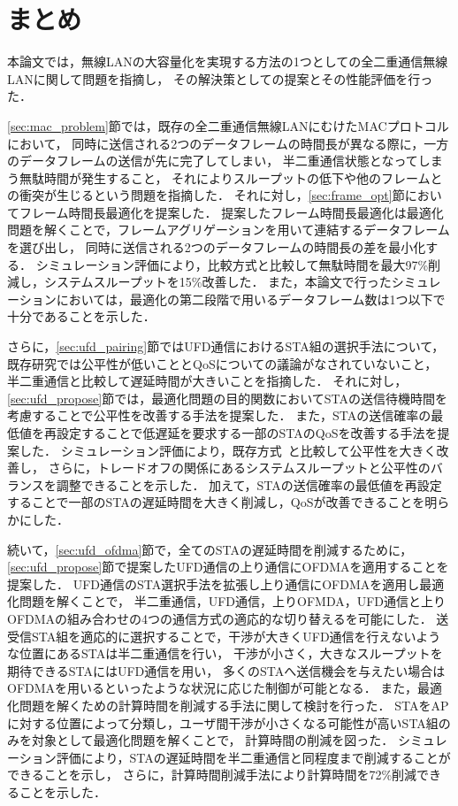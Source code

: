 \documentclass[master]{kuisthesis}		%
\begin{document}
\section{まとめ}
	本論文では，無線LANの大容量化を実現する方法の1つとしての全二重通信無線LANに関して問題を指摘し，
	その解決策としての提案とその性能評価を行った．
	\par
	\ref{sec:mac_problem}節では，既存の全二重通信無線LANにむけたMACプロトコルにおいて，
	同時に送信される2つのデータフレームの時間長が異なる際に，一方のデータフレームの送信が先に完了してしまい，
	半二重通信状態となってしまう無駄時間が発生すること，
	それによりスループットの低下や他のフレームとの衝突が生じるという問題を指摘した．
	それに対し，\ref{sec:frame_opt}節においてフレーム時間長最適化を提案した．
	提案したフレーム時間長最適化は最適化問題を解くことで，フレームアグリゲーションを用いて連結するデータフレームを選び出し，
	同時に送信される2つのデータフレームの時間長の差を最小化する．
	シミュレーション評価により，比較方式と比較して無駄時間を最大97\%削減し，システムスループットを15\%改善した．
	また，本論文で行ったシミュレーションにおいては，最適化の第二段階で用いるデータフレーム数は1つ以下で十分であることを示した．
	\par
	さらに，\ref{sec:ufd_pairing}節ではUFD通信におけるSTA組の選択手法について，
	既存研究では公平性が低いこととQoSについての議論がなされていないこと，
	半二重通信と比較して遅延時間が大きいことを指摘した．
	それに対し，\ref{sec:ufd_propose}節では，最適化問題の目的関数においてSTAの送信待機時間を考慮することで公平性を改善する手法を提案した．
	また，STAの送信確率の最低値を再設定することで低遅延を要求する一部のSTAのQoSを改善する手法を提案した．
	シミュレーション評価により，既存方式~\cite{promac}と比較して公平性を大きく改善し，
	さらに，トレードオフの関係にあるシステムスループットと公平性のバランスを調整できることを示した．
	加えて，STAの送信確率の最低値を再設定することで一部のSTAの遅延時間を大きく削減し，QoSが改善できることを明らかにした．
	\par
	続いて，\ref{sec:ufd_ofdma}節で，全てのSTAの遅延時間を削減するために，
	\ref{sec:ufd_propose}節で提案したUFD通信の上り通信にOFDMAを適用することを提案した．
	UFD通信のSTA選択手法を拡張し上り通信にOFDMAを適用し最適化問題を解くことで，
	半二重通信，UFD通信，上りOFMDA，UFD通信と上りOFDMAの組み合わせの4つの通信方式の適応的な切り替えるを可能にした．
	送受信STA組を適応的に選択することで，干渉が大きくUFD通信を行えないような位置にあるSTAは半二重通信を行い，
	干渉が小さく，大きなスループットを期待できるSTAにはUFD通信を用い，
	多くのSTAへ送信機会を与えたい場合はOFDMAを用いるといったような状況に応じた制御が可能となる．
	また，最適化問題を解くための計算時間を削減する手法に関して検討を行った．
	STAをAPに対する位置によって分類し，ユーザ間干渉が小さくなる可能性が高いSTA組のみを対象として最適化問題を解くことで，
	計算時間の削減を図った．
	シミュレーション評価により，STAの遅延時間を半二重通信と同程度まで削減することができることを示し，
	さらに，計算時間削減手法により計算時間を72\%削減できることを示した．
\end{document}
